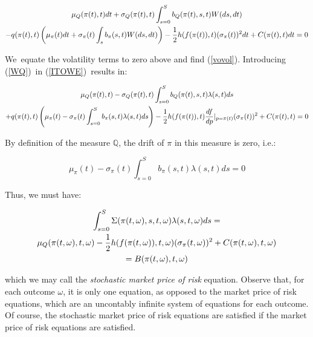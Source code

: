 \documentclass{article}
\begin{document}
\begin{gather}
\mu _{Q}(\pi (t),t)dt+\sigma _{Q}(\pi (t),t)\int_{s=0}^{S}b_{Q}(\pi
(t),s,t)W(ds,dt)  \label{ITOWE} \\
-q(\pi (t),t)\left( \mu _{\pi }(t)dt+\sigma _{\pi }(t)\int_{s}b_{\pi
}(s,t)W(ds,dt)\right) -\frac{1}{2}h(f(\pi (t)),t)(\sigma _{\pi
}(t))^{2}dt+C(\pi (t),t)dt=0  \notag
\end{gather}

We\ equate the volatility terms to zero above and find (\ref{vovol}).
Introducing (\ref{WQ})\ in (\ref{ITOWE})\ results in:

\begin{gather}
\mu _{Q}(\pi (t),t)-\sigma _{Q}(\pi (t),t)\int_{s=0}^{S}b_{Q}(\pi
(t),s,t)\lambda (s,t)ds \\
+q(\pi (t),t)\left( \mu _{\pi }(t)-\sigma _{\pi }(t)\int_{s=0}^{S}b_{\pi
}(s,t)\lambda (s,t)ds\right) -\frac{1}{2}h(f(\pi (t)),t)\frac{df}{dp}%
|_{p=\pi (t)}(\sigma _{\pi }(t))^{2}+C(\pi (t),t)=0  \notag
\end{gather}%
\bigskip

By definition of the measure $\mathbb{Q}$, the drift of $\pi $ in this
measure is zero, i.e.:

\begin{equation*}
\mu _{\pi }(t)-\sigma _{\pi }(t)\int_{s=0}^{S}b_{\pi }(s,t)\lambda (s,t)ds=0
\end{equation*}

Thus, we must have:

\begin{gather}
\int_{s=0}^{S}\Sigma (\pi (t,\omega ),s,t,\omega )\lambda (s,t,\omega )ds=
\label{mpr_stoch} \\
\mu _{Q}(\pi (t,\omega ),t,\omega )-\frac{1}{2}h(f(\pi (t,\omega )),t,\omega
)(\sigma _{\pi }(t,\omega ))^{2}+C(\pi (t,\omega ),t,\omega )  \notag \\
=B(\pi (t,\omega ),t,\omega )
\end{gather}

which we may call the \textit{stochastic market price of risk} equation.
Observe that, for each outcome $\omega $, it is only one equation, as
opposed to the market price of risk equations, which are an uncontably
infinite system of equations for each outcome. Of course, the stochastic
market price of risk equations are satisfied if the market price of risk
equations are satisfied.
\end{document}
